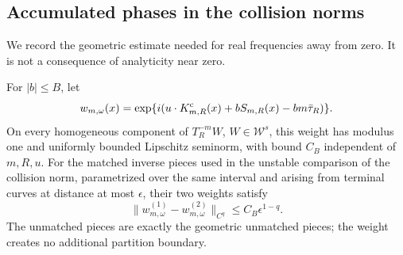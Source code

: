\subsection{Accumulated phases in the collision norms}
We record the geometric estimate needed for real frequencies away from
zero. It is not a consequence of analyticity near zero.

\begin{lemma}
\label{lem:collision-action-weights}
For $|b|\le B$, let
\[
 w_{m,\omega}(x)=\exp\{i(u\cdot K^{\rm c}_{m,R}(x)
                         +bS_{m,R}(x)-bm\bar\tau_R)\}.
\]
On every homogeneous component of $T_R^{-m}W$, $W\in\mathcal W^s$,
this weight has modulus one and uniformly bounded Lipschitz seminorm,
with bound $C_B$ independent of $m,R,u$. For the matched inverse pieces
used in the unstable comparison of the collision norm, parametrized
over the same interval and arising from terminal curves at distance
at most $\epsilon$, their two weights satisfy
\begin{equation}\label{eq:matched-action-weight}
 \|w_{m,\omega}^{(1)}-w_{m,\omega}^{(2)}\|_{C^q}
                       \le C_B\epsilon^{1-q}.
\end{equation}
The unmatched pieces are exactly the geometric unmatched pieces; the
weight creates no additional partition boundary.
\end{lemma}
